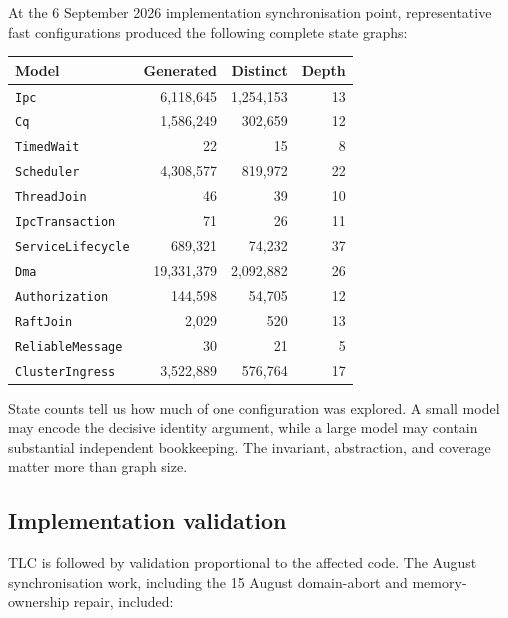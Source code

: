 At the 6 September 2026 implementation synchronisation point, representative
fast configurations produced the following complete state graphs:

\begin{longtable}{|p{}|r|r|r|}
\hline
\textbf{Model} & \textbf{Generated} & \textbf{Distinct} & \textbf{Depth} \\
\hline
\texttt{Ipc} & 6,118,645 & 1,254,153 & 13 \\
\hline
\texttt{Cq} & 1,586,249 & 302,659 & 12 \\
\hline
\texttt{TimedWait} & 22 & 15 & 8 \\
\hline
\texttt{Scheduler} & 4,308,577 & 819,972 & 22 \\
\hline
\texttt{ThreadJoin} & 46 & 39 & 10 \\
\hline
\texttt{IpcTransaction} & 71 & 26 & 11 \\
\hline
\texttt{ServiceLifecycle} & 689,321 & 74,232 & 37 \\
\hline
\texttt{Dma} & 19,331,379 & 2,092,882 & 26 \\
\hline
\texttt{Authorization} & 144,598 & 54,705 & 12 \\
\hline
\texttt{RaftJoin} & 2,029 & 520 & 13 \\
\hline
\texttt{ReliableMessage} & 30 & 21 & 5 \\
\hline
\texttt{ClusterIngress} & 3,522,889 & 576,764 & 17 \\
\hline
\end{longtable}

State counts tell us how much of one configuration was explored. A
small model may encode the decisive identity argument, while a large model may
contain substantial independent bookkeeping. The invariant, abstraction, and
coverage matter more than graph size.

\subsection{Implementation validation}

TLC is followed by validation proportional to the affected code. The August
synchronisation work, including the 15 August domain-abort and memory-ownership
repair, included:

